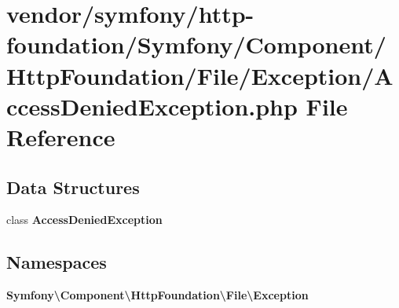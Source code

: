 \section{vendor/symfony/http-\/foundation/\+Symfony/\+Component/\+Http\+Foundation/\+File/\+Exception/\+Access\+Denied\+Exception.php File Reference}
\label{http-foundation_2_symfony_2_component_2_http_foundation_2_file_2_exception_2_access_denied_exception_8php}
\subsection*{Data Structures}
\begin{DoxyCompactItemize}
\item 
class {\bf Access\+Denied\+Exception}
\end{DoxyCompactItemize}
\subsection*{Namespaces}
\begin{DoxyCompactItemize}
\item 
 {\bf Symfony\textbackslash{}\+Component\textbackslash{}\+Http\+Foundation\textbackslash{}\+File\textbackslash{}\+Exception}
\end{DoxyCompactItemize}
